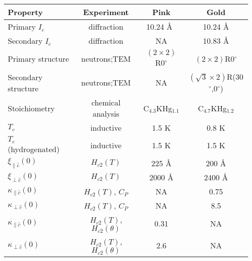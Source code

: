 {\newpage
\clearpage
\samepage \begin{table}%
\begin{center}

\label{pink-gold}
\begin{tabular}{||l|c|c|c||}
\hline
Property & Experiment & Pink  & Gold \\  
\hline
Primary $I_c$ & diffraction\cite{kamitakahara84,lagrange83}& 10.24 \AA\ &
10.24 \AA \\ 
Secondary $I_c$ & diffraction\cite{kamitakahara84,lagrange83}& NA  &10.83 \AA \\ 
Primary structure & neutrons\cite{kamitakahara84};TEM\cite{J140} & $(2 \times 2)$R0$^{\circ}$ &  $(2 \times 2)$R0$^{\circ}$  \\ 
Secondary structure & neutrons\cite{kamitakahara84};TEM\cite{J140} &NA & $(\sqrt{3} \times 2)$R(30$^{\circ}$,0$^{\circ}$) \\ 
Stoichiometry & chemical analysis & C$_{4.3}$KHg$_{1.1}$ & C$_{4.7}$KHg$_{1.2}$ \\ 
$T_c$ & inductive & 1.5 K & 0.8 K \\ 
$T_c$ (hydrogenated) & inductive & 1.5 K\cite{H242} & 1.5 K\cite{H242} \\ 
$\xi_{\parallel \hat{c}}(0)$ & $H_{c2}(T)$ & 225 \AA & 200 \AA \\ 
$\xi_{\perp \hat{c}}(0)$ & $H_{c2}(T)$ & 2000 \AA & 2400 \AA \\ 
$ \kappa_{\parallel\hat{c}}(0)$ & $H_{c2}(T)$, $C_P$\cite{alexander81}   & NA & 0.75 \\ 
$ \kappa_{\perp\hat{c}}(0)$& $H_{c2}(T)$, $C_P$\cite{alexander81}  & NA & 8.5 \\ 
$ \kappa_{\parallel\hat{c}}(0)$ & $H_{c2}(T)$, $H_{c2}(\theta)$ & 0.31 & NA\\ 
$ \kappa_{\perp\hat{c}}(0)$& $H_{c2}(T)$, $H_{c2}(\theta)$& 2.6 & NA \\ 
%

\hline
\end{tabular}
\end{center}
\end{table}
}




